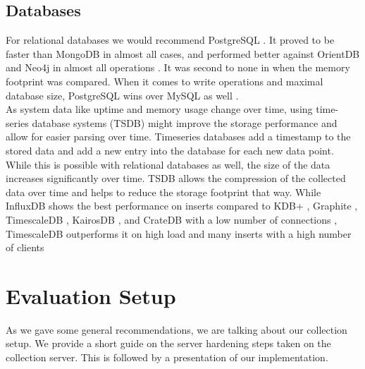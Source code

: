     \subsection{Databases} 
        \label{subsec:database}
        For relational databases we would recommend PostgreSQL \cite{group_postgresql_2021}. It proved to be faster than MongoDB \cite{makris_mongodb_2020} in almost all cases, and performed better against OrientDB and Neo4j in almost all operations \cite{noauthor_benchmark_2018}. It was second to none in  \cite{noauthor_benchmark_2018} when the memory footprint was compared.
        When it comes to write operations and maximal database size, PostgreSQL wins over MySQL as well \cite{noauthor_mysql_2021}.\\
        As system data like uptime and memory usage change over time, using time-series database systems (TSDB) might improve the storage performance and allow for easier parsing over time. Timeseries databases add a timestamp to the stored data and add a new entry into the database for each new data point. While this is possible with relational databases as well, the size of the data increases significantly over time. TSDB allows the compression of the collected data over time and helps to reduce the storage footprint that way. While InfluxDB shows the best performance on inserts compared to KDB+ \cite{noauthor_kdb_nodate}, Graphite \cite{noauthor_graphite_nodate}, TimescaleDB \cite{noauthor_time-series_nodate}, KairosDB \cite{noauthor_kairosdb_nodate}, and CrateDB \cite{noauthor_cratedb_nodate} with a low number of connections \cite{sychev_closed_2020}, TimescaleDB outperforms it on high load and many inserts with a high number of clients \cite{freedman_timescaledb_2020}
%
\newpage

\section{Evaluation Setup}
\label{sec:measurement:eval_setup}
%
    As we gave some general recommendations, we are talking about our collection setup.
    We provide a short guide on the server hardening steps taken on the collection server. This is followed by a presentation of our implementation.
    
